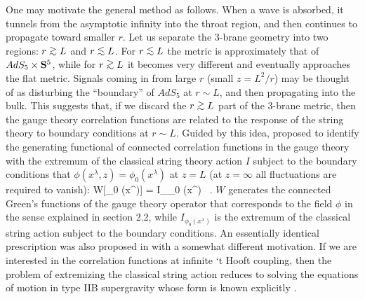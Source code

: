 \documentclass[12pt]{article}
\begin{document}
One may motivate the general method
as follows. When a wave is absorbed, it tunnels from the asymptotic
infinity into the throat region, and then continues to propagate
toward smaller $r$. Let us separate the 3-brane geometry into two
regions: $r\gsim L$ and $r\lsim L$. For $r\lsim L$ the metric is
approximately that of $AdS_5\times {\bf S}^5$, while for $r\gsim L$
it becomes very different and eventually approaches the flat metric.
Signals coming in from large $r$ (small $z=L^2/r$)
may be thought of as disturbing the
``boundary'' of $AdS_5$ at $r\sim L$, and then propagating into the
bulk. This suggests that, if we discard the $r\gsim L$ part of the
3-brane metric, then 
the gauge theory correlation functions are related to
the response of the string theory to boundary conditions at $r\sim L$.
Guided by this idea, \cite{US} proposed
to identify the generating functional of connected
correlation functions in the gauge theory with the extremum of the
classical string theory action $I$ subject to the boundary conditions 
that $\phi(x^\lambda, z) = \phi_0 (x^\lambda)$ at
$z=L$ (at $z=\infty$ all fluctuations are required to vanish): 
\be \label{GKPW}
   W[\phi_0 (x^\lambda)] = I_{\phi_0 (x^\lambda)} 
     \ . 
\ee 
 $W$ generates the connected Green's functions of the gauge theory
operator that corresponds to the field $\phi$ in the sense explained
in section 2.2, 
while $I_{\phi_0 (x^\lambda)} $ 
is the extremum of the classical string action
subject to the boundary conditions. 
An essentially identical prescription
was also proposed in \cite{EW} with a somewhat different motivation.
If we are interested in the
correlation functions at infinite `t Hooft coupling, then the
problem of extremizing the
classical string action reduces to solving the equations of
motion in type IIB supergravity whose form is known explicitly
\cite{SH}.
\end{document}
